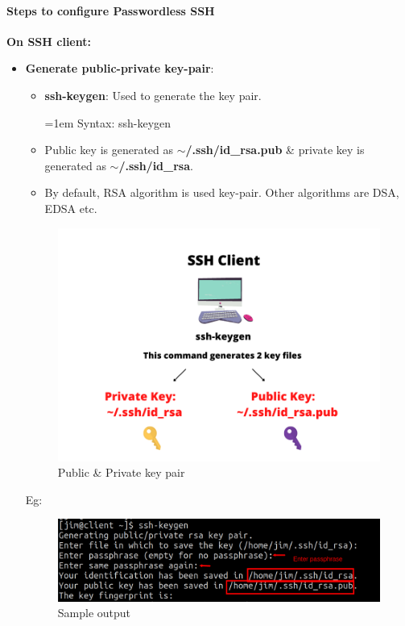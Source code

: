 \begin{flushleft}
\begin{itemize}
\end{itemize}

\newpage
\paragraph{Steps to configure Passwordless SSH}

\textbf{On SSH client:}
\begin{itemize}
	\item \textbf{Generate public-private key-pair}:
	\begin{itemize}
		\item \textbf{ssh-keygen}: Used to generate the key pair.
		\begin{tcolorbox}[breakable,notitle,boxrule=0pt,colback=pink,colframe=pink]
			\color{black}
			\font=1em
			Syntax: ssh-keygen
			\font=4pt
		\end{tcolorbox}
		
		\item Public key is generated as \textbf{$\sim$/.ssh/id\_rsa.pub} \& private key is generated as \textbf{$\sim$/.ssh/id\_rsa}.
		\item By default, RSA algorithm is used key-pair. Other algorithms are DSA, EDSA etc.
	\end{itemize}

	\begin{figure}[h!]
		\centering
		\includegraphics[scale=0.4]{content/chapter19/images/ssh0.png}
		\caption{Public \& Private key pair}
		\label{fig:stage5563}
	\end{figure}
	
	Eg:
	\begin{figure}[h!]
		\centering
		\includegraphics[scale=0.2]{content/chapter19/images/ssh9.png}
		\caption{Sample output}
		\label{fig:stage7}
	\end{figure}
	

\end{itemize}
\end{flushleft}
